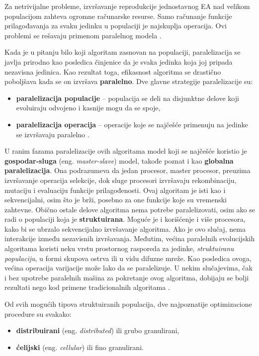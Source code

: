 \documentclass[a4paper]{article}
\begin{document}
Za netrivijalne probleme, izvršavanje reprodukcije jednostavnog EA nad velikom populacijom zahteva ogromne računarske resurse. Samo računanje funkcije prilagođavanja za svaku jedinku u populaciji je najskuplja operacija. Ovi problemi se rešavaju primenom paralelnog modela \cite{alba}.

Kada je u pitanju bilo koji algoritam zasnovan na populaciji, paralelizacija se javlja prirodno kao posledica činjenice da je svaka jedinka koja joj pripada nezavisna jedinica. Kao rezultat toga, efikasnost algoritma se drastično poboljšava kada se on izvršava \textbf{paralelno}. Dve glavne strategije paralelizacije su: 
\begin{itemize}
    \item \textbf{paralelizacija populacije} -- populacija se deli na disjunktne delove koji evoluiraju odvojeno i kasnije mogu da se spoje,
    \item \textbf{paralelizacija operacija} -- operacije koje se najčešće primenuju na jedinke se izvršavaju paralelno \cite{alba}.
\end{itemize}{}

U ranim fazama paralelizacije ovih algoritama model koji se najčešće koristio je \textbf{gospodar-sluga} (eng. \textit{master-slave})  model, takođe poznat i kao \textbf{globalna paralelizacija}. Ona podrazumeva da jedan procesor, master procesor, preuzima izvršavanje operacija selekcije, dok sluge procesori izvršavaju rekombinaciju, mutaciju i evaluaciju funkcije prilagođenosti. Ovaj algoritam je isti kao i sekvencijalni, osim što je brži, posebno za one funkcije koje su vremenski zahtevne. Obično ostale delove algoritma nema potrebe paralelizovati, osim ako se radi o populaciji koja je \textbf{struktuirana}. Moguće je i korišćenje i više procesora, kako bi se ubrzalo sekvencijalno izvršavanje algoritma. Ako je ovo slučaj, nema interakcije između nezavisnih izvršavanja. Međutim, većina paralelnih evolucijskih algoritama koristi neku vrstu prostornog rasporeda za jedinke, \textit{struktuiranu populaciju}, u formi skupova ostrva ili u vidu difuzne mreže. Kao posledica ovoga, većina operacija varijacije može lako da se paralelizuje. U nekim slučajevima, čak i bez upotrebe paralelnih mašina za pokretanje ovog algoritma, dobijaju se bolji rezultati nego kod primene tradicionalnih algoritama \cite{alba}.
 
Od svih mogućih tipova struktuiranih populacija, dve najpoznatije optimizacione procedure su svakako:
\begin{itemize}
    \item \textbf{distribuirani} (eng. \textit{distributed}) ili grubo granulirani,
    \item\textbf{ćelijski} (eng. \textit{cellular}) ili fino granulirani.
\end{itemize}{}
\end{document}
